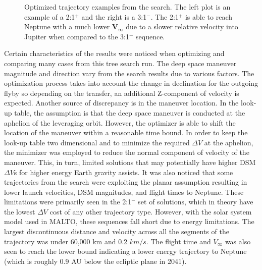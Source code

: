 \documentclass[letterpaper, preprint, paper,11pt]{AAS}	%
\newcommand*\circled[1]{\tikz[baseline=(char.base)]{
            \node[shape=circle,draw,inner sep=0.8pt] (char) {#1};}}
\begin{document}
\begin{figure}[htb]
\begin{subfigure}
    \end{subfigure}
    \caption{Optimized trajectory examples from the search. The left plot is an example of a 2:1$^{+}$ and the right is a 3:1$^{-}$. The 2:1$^{+}$ is able to reach Neptune with a much lower $\boldsymbol{V_\infty}$ due to a slower relative velocity into Jupiter when compared to the 3:1$^{-}$ sequence.}
    \label{fig:maltotriton}
\end{figure}

Certain characteristics of the results were noticed when optimizing and comparing many cases from this tree search run. The deep space maneuver magnitude and direction vary from the search results due to various factors. The optimization process takes into account the change in declination for the outgoing flyby so depending on the transfer, an additional Z-component of velocity is expected. Another source of discrepancy is in the maneuver location. In the look-up table, the assumption is that the deep space maneuver is conducted at the aphelion of the leveraging orbit. However, the optimizer is able to shift the location of the maneuver within a reasonable time bound. In order to keep the look-up table two dimensional and to minimize the required $\Delta V$ at the aphelion, the minimizer was employed to reduce the normal component of velocity of the maneuver. This, in turn, limited solutions that may potentially have higher DSM $\Delta V$s for higher energy Earth gravity assists. It was also noticed that some trajectories from the search were exploiting the planar assumption resulting in lower launch velocities, DSM magnitudes, and flight times to Neptune. These limitations were primarily seen in the 2:1$^{-}$ set of solutions, which in theory have the lowest $\Delta V$ cost of any other trajectory type. However, with the solar system model used in MALTO, these sequences fall short due to energy limitations. The largest discontinuous distance and velocity across all the segments of the trajectory was under 60,000 km and 0.2 $km/s$. The flight time and $V_\infty$ was also seen to reach the lower bound indicating a lower energy trajectory to Neptune (which is roughly 0.9 AU below the ecliptic plane in 2041).
\end{document}
